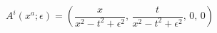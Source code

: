 \begin{equation}
   A^i (x^a; \epsilon)= \left( \frac{x}{x^2 - t^2 +\epsilon^2}, \, \frac{t}{x^2 - t^2 +\epsilon^2}, \, 0,\, 0\right)
   \label{vectorpot}
   \end{equation} 
